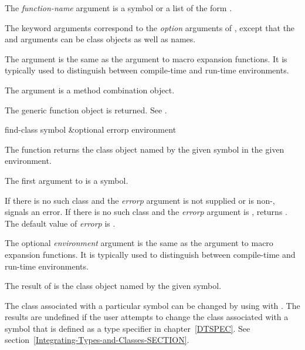 \begin{defun}[Function]
The {\it function-name\/} argument is a symbol or a list of the
form .

The keyword arguments correspond to the {\it option\/} arguments of
, except that the  and
 arguments can be class objects
as well as names.


The  argument is the same as the 
 argument to macro expansion functions.  It is typically
used to distinguish between compile-time and run-time environments.

The  argument is a method combination object.


The generic function object is returned.
See .
\end{defun}


\begin{defun}[Function]
find-class symbol &optional errorp environment

The function  returns the class object named by the
given symbol in the given environment.




The first argument to  is a symbol. 

If there is no such class and the {\it errorp\/} argument is
not supplied or is non-,  signals an error.
If there is no such class and the {\it errorp\/} argument is
,  returns .  The default value of
{\it errorp\/} is .

The optional {\it environment\/} argument is the same as the 
 argument to macro expansion functions.  It is typically
used to distinguish between compile-time and run-time environments.


The result of  is the class object named by the given symbol.


The class associated with a particular symbol can be changed by using
 with .  The results are undefined if
the user attempts to change the class associated with a symbol that is
defined as a type specifier in chapter~\ref{DTSPEC}.
See section~\ref{Integrating-Types-and-Classes-SECTION}.

\end{defun}


